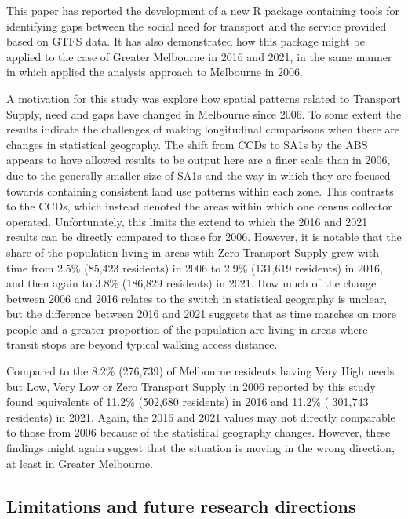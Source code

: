 \documentclass[preprint, 3p,
authoryear]{elsarticle} %
\begin{document}
This paper has reported the development of a new R package containing
tools for identifying gaps between the social need for transport and the
service provided based on GTFS data. It has also demonstrated how this
package might be applied to the case of Greater Melbourne in 2016 and
2021, in the same manner in which \citet{currie2010identifying} applied
the analysis approach to Melbourne in 2006.

A motivation for this study was explore how spatial patterns related to
Transport Supply, need and gaps have changed in Melbourne since 2006. To
some extent the results indicate the challenges of making longitudinal
comparisons when there are changes in statistical geography. The shift
from CCDs to SA1s by the ABS appears to have allowed results to be
output here are a finer scale than in 2006, due to the generally smaller
size of SA1s and the way in which they are focused towards containing
consistent land use patterns within each zone. This contrasts to the
CCDs, which instead denoted the areas within which one census collector
operated. Unfortunately, this limits the extend to which the 2016 and
2021 results can be directly compared to those for 2006. However, it is
notable that the share of the population living in areas wtih Zero
Transport Supply grew with time from 2.5\% (85,423 residents) in 2006 to
2.9\% (131,619 residents) in 2016, and then again to 3.8\% (186,829
residents) in 2021. How much of the change between 2006 and 2016 relates
to the switch in statistical geography is unclear, but the difference
between 2016 and 2021 suggests that as time marches on more people and a
greater proportion of the population are living in areas where transit
stops are beyond typical walking access distance.

Compared to the 8.2\% (276,739) of Melbourne residents having Very High
needs but Low, Very Low or Zero Transport Supply in 2006 reported by
\citet{currie2010identifying} this study found equivalents of 11.2\%
(502,680 residents) in 2016 and 11.2\% ( 301,743 residents) in 2021.
Again, the 2016 and 2021 values may not directly comparable to those
from 2006 because of the statistical geography changes. However, these
findings might again suggest that the situation is moving in the wrong
direction, at least in Greater Melbourne.

\subsection{Limitations and future research
directions}\label{limitations-and-future-research-directions}
\end{document}
